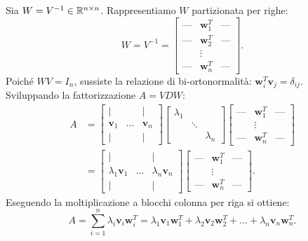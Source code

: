 Sia $W = V^{-1} \in \mathbb{R}^{n \times n}$. Rappresentiamo $W$ partizionata per righe:
\begin{equation}
    W = V^{-1} = \begin{bmatrix} \text{---} & \mathbf{w}_1^T & \text{---} \\ \text{---} & \mathbf{w}_2^T & \text{---} \\ & \vdots & \\ \text{---} & \mathbf{w}_n^T & \text{---} \end{bmatrix}.
\end{equation}
Poich\'e $W V = I_n$, sussiste la relazione di bi-ortonormalit\`a: $\mathbf{w}_i^T \mathbf{v}_j = \delta_{ij}$. Sviluppando la fattorizzazione $A = V D W$:
\begin{align}
    A &= \begin{bmatrix} \mid & & \mid \\ \mathbf{v}_1 & \dots & \mathbf{v}_n \\ \mid & & \mid \end{bmatrix} \begin{bmatrix} \lambda_1 & & \\ & \ddots & \\ & & \lambda_n \end{bmatrix} \begin{bmatrix} \text{---} & \mathbf{w}_1^T & \text{---} \\ & \vdots & \\ \text{---} & \mathbf{w}_n^T & \text{---} \end{bmatrix} \nonumber \\
    &= \begin{bmatrix} \mid & & \mid \\ \lambda_1 \mathbf{v}_1 & \dots & \lambda_n \mathbf{v}_n \\ \mid & & \mid \end{bmatrix} \begin{bmatrix} \text{---} & \mathbf{w}_1^T & \text{---} \\ & \vdots & \\ \text{---} & \mathbf{w}_n^T & \text{---} \end{bmatrix}.
\end{align}
Eseguendo la moltiplicazione a blocchi colonna per riga si ottiene:
\begin{equation}
    A = \sum_{i=1}^n \lambda_i \mathbf{v}_i \mathbf{w}_i^T = \lambda_1 \mathbf{v}_1 \mathbf{w}_1^T + \lambda_2 \mathbf{v}_2 \mathbf{w}_2^T + \dots + \lambda_n \mathbf{v}_n \mathbf{w}_n^T.
\end{equation}

